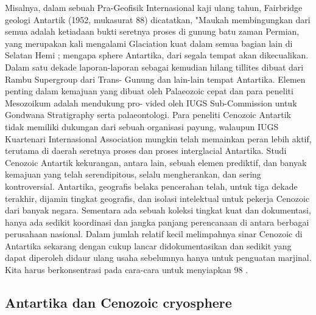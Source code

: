 		Misalnya, dalam sebuah Pra-Geofisik Internasional kaji ulang tahun, Fairbridge geologi Antartik (1952, mukasurat 88) dicatatkan, 
	"Maukah membingungkan dari semua adalah ketiadaan bukti seretnya proses di gunung batu zaman Permian, yang merupakan kali mengalami Glaciation 
	kuat dalam semua bagian lain di Selatan Hemi ; mengapa sphere Antartika, dari segala tempat akan dikecualikan. Dalam satu dekade laporan-laporan 
	sebagai kemudian hilang tillites dibuat dari Rambu Supergroup dari Trans- Gunung dan lain-lain tempat Antartika. Elemen penting dalam kemajuan yang 
	dibuat oleh Palaeozoic cepat dan para peneliti Mesozoikum adalah mendukung pro- vided oleh IUGS Sub-Commission untuk Gondwana Stratigraphy serta 
	palaeontologi. Para peneliti Cenozoic Antartik tidak memiliki dukungan dari sebuah organisasi payung, walaupun IUGS Kuartenari Internasional Association 
	mungkin telah memainkan peran lebih aktif, terutama di daerah seretnya proses dan proses interglacial Antartika. Studi Cenozoic Antartik kekurangan, 
	antara lain, sebuah elemen prediktif, dan banyak kemajuan yang telah serendipitous, selalu mengherankan, dan sering kontroversial. 
	Antartika, geografis belaka pencerahan telah, untuk tiga dekade terakhir, dijamin tingkat geografis, dan isolasi intelektual untuk pekerja Cenozoic 
	dari banyak negara. Sementara ada sebuah koleksi tingkat kuat dan dokumentasi, hanya ada sedikit koordinasi dan jangka panjang perencanaan di antara 
	berbagai perusahaan nasional. Dalam jumlah relatif kecil melimpahnya sinar Cenozoic di Antartika sekarang dengan cukup lancar didokumentasikan dan 
	sedikit yang dapat diperoleh didaur ulang usaha sebelumnya hanya untuk penguatan marjinal. Kita harus berkonsentrasi pada cara-cara untuk menyiapkan 
	98%
	\cite{peter1990Antartica}.
	

\subsection{Antartika dan Cenozoic cryosphere}

